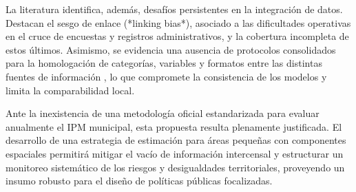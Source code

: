La literatura identifica, además, desafíos persistentes en la integración de datos. Destacan el sesgo de enlace (*linking bias*), asociado a las dificultades operativas en el cruce de encuestas y registros administrativos, y la cobertura incompleta de estos últimos. Asimismo, se evidencia una ausencia de protocolos consolidados para la homologación de categorías, variables y formatos entre las distintas fuentes de información \cite{dane2024}, lo que compromete la consistencia de los modelos y limita la comparabilidad local.

Ante la inexistencia de una metodología oficial estandarizada para evaluar anualmente el IPM municipal, esta propuesta resulta plenamente justificada. El desarrollo de una estrategia de estimación para áreas pequeñas con componentes espaciales permitirá mitigar el vacío de información intercensal y estructurar un monitoreo sistemático de los riesgos y desigualdades territoriales, proveyendo un insumo robusto para el diseño de políticas públicas focalizadas.
